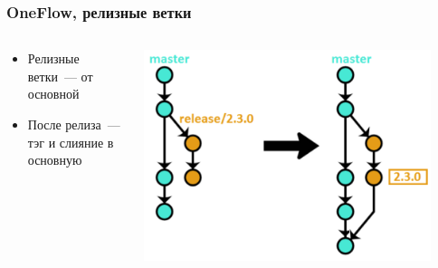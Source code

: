 \documentclass{../../slides-style}
\begin{document}
    \begin{frame}
        \frametitle{OneFlow, релизные ветки}
        \begin{columns}
            \begin{column}{0.4\textwidth}
                \begin{itemize}
                    \item Релизные ветки~--- от основной
                    \item После релиза~--- тэг и слияние в основную
                \end{itemize}
            \end{column}
            \begin{column}{0.6\textwidth}
                \begin{center}
                    \includegraphics[width=0.9\textwidth]{oneflow4.png}
                \end{center}
            \end{column}
        \end{columns}
    \end{frame}
\end{document}
